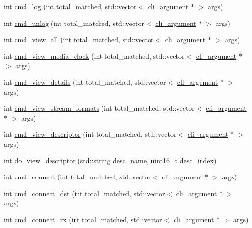 \begin{DoxyCompactItemize}
int \hyperlink{classcmd__line_aec9ae277cca4d0df74e0d830fb173a98}{cmd\+\_\+log} (int total\+\_\+matched, std\+::vector$<$ \hyperlink{classcli__argument}{cli\+\_\+argument} $\ast$ $>$ args)
\item 
int \hyperlink{classcmd__line_af7ad53e6f21e2fa66295cee36c15d3cf}{cmd\+\_\+unlog} (int total\+\_\+matched, std\+::vector$<$ \hyperlink{classcli__argument}{cli\+\_\+argument} $\ast$ $>$ args)
\item 
int \hyperlink{classcmd__line_a4f2876782cacbec5bdf0fe461e4fecf6}{cmd\+\_\+view\+\_\+all} (int total\+\_\+matched, std\+::vector$<$ \hyperlink{classcli__argument}{cli\+\_\+argument} $\ast$ $>$ args)
\item 
int \hyperlink{classcmd__line_a25484a960144a8421a972c552d4b829f}{cmd\+\_\+view\+\_\+media\+\_\+clock} (int total\+\_\+matched, std\+::vector$<$ \hyperlink{classcli__argument}{cli\+\_\+argument} $\ast$ $>$ args)
\item 
int \hyperlink{classcmd__line_afb1e2fe0ed7b269ad35069f573452766}{cmd\+\_\+view\+\_\+details} (int total\+\_\+matched, std\+::vector$<$ \hyperlink{classcli__argument}{cli\+\_\+argument} $\ast$ $>$ args)
\item 
int \hyperlink{classcmd__line_a9f3fe210169a28594ccb54ac28ed8123}{cmd\+\_\+view\+\_\+stream\+\_\+formats} (int total\+\_\+matched, std\+::vector$<$ \hyperlink{classcli__argument}{cli\+\_\+argument} $\ast$ $>$ args)
\item 
int \hyperlink{classcmd__line_abfd19a6de59d0ed6976c58b29253c403}{cmd\+\_\+view\+\_\+descriptor} (int total\+\_\+matched, std\+::vector$<$ \hyperlink{classcli__argument}{cli\+\_\+argument} $\ast$ $>$ args)
\item 
int \hyperlink{classcmd__line_aef7d9f8c4eff85c46e5b7aea0961bb51}{do\+\_\+view\+\_\+descriptor} (std\+::string desc\+\_\+name, uint16\+\_\+t desc\+\_\+index)
\item 
int \hyperlink{classcmd__line_a3378afaff29dbd27e191a20fad8ab9cd}{cmd\+\_\+connect} (int total\+\_\+matched, std\+::vector$<$ \hyperlink{classcli__argument}{cli\+\_\+argument} $\ast$ $>$ args)
\item 
int \hyperlink{classcmd__line_ad7dd82af67a144efd5aa3330d888d04c}{cmd\+\_\+connect\+\_\+dst} (int total\+\_\+matched, std\+::vector$<$ \hyperlink{classcli__argument}{cli\+\_\+argument} $\ast$ $>$ args)
\item 
int \hyperlink{classcmd__line_a2c30ba2b18769889b2402e945919e600}{cmd\+\_\+connect\+\_\+rx} (int total\+\_\+matched, std\+::vector$<$ \hyperlink{classcli__argument}{cli\+\_\+argument} $\ast$ $>$ args)

\end{DoxyCompactItemize}
